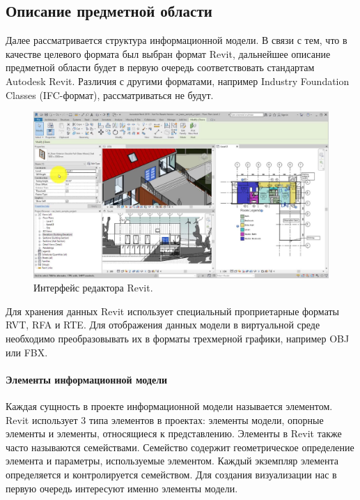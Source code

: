﻿\subsection{Описание предметной области}

Далее рассматривается структура информационной модели.
В связи с тем, что в качестве целевого формата был выбран  формат Revit,
дальнейшее описание предметной области будет в первую очередь
соответствовать стандартам Autodesk Revit.
Различия с другими форматами, например Industry Foundation Classes (IFC-формат),%
\cite{BuildingSmartIFC}
рассматриваться не будут.

\begin{figure}[h]
    \includegraphics[width=\textwidth]{images/Revit-interface.jpg}
    \caption{Интерфейс редактора Revit.%
    \cite{DocRevit}}
    \label{figure:RevitInterface}
\end{figure}

Для хранения данных Revit использует специальный проприетарные форматы RVT, RFA и RTE.
Для отображения данных модели в виртуальной среде необходимо
преобразовывать их в форматы трехмерной графики, например OBJ или FBX.

\paragraph{Элементы информационной модели}

Каждая сущность в проекте информационной модели называется элементом.
Revit использует 3 типа элементов в проектах:
элементы модели, опорные элементы и элементы, относящиеся к представлению.
Элементы в Revit также часто называются семействами.
Семейство содержит геометрическое определение элемента и
параметры, используемые элементом.
Каждый экземпляр элемента определяется и контролируется семейством.%
\cite{DocRevit}
Для создания визуализации нас в первую очередь интересуют
именно элементы модели.

